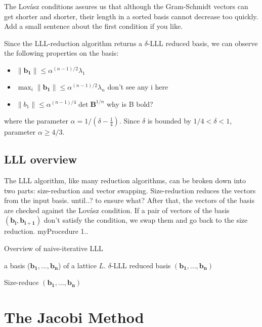 \documentclass[10pt, a4paper]{article}
\newcommand{\my}[1]{{\color{blue} #1 }}
\renewcommand{\vec}[1]{\mathbf{#1}}
\begin{document}
The Lovász conditions assures us that although the Gram-Schmidt vectors can get shorter and shorter, their length in a sorted basis cannot decrease too quickly. \my{Add a small sentence about the first condition if you like.}

Since the LLL-reduction algorithm returns a $\delta$-LLL reduced basis, we can observe the following properties on the basis:
\begin{itemize}
\item $\| \vec{b_1} \| \leq \alpha^{(n-1)/2} \lambda_1 $
\item $\max_i \| \vec{b_1} \| \leq \alpha^{(n-1)/2} \lambda_n $ \my{don't see any i here}
\item $\| b_1 \| \leq \alpha^{(n-1)/4} \det \vec{B}^{1/n}$ \my{why is B bold?}
\end{itemize} 
where the parameter $\alpha = 1/(\delta - \frac{1}{4})$. Since $\delta$ is bounded by $1/4 < \delta < 1$, parameter $\alpha \geq 4/3$.

\subsection{LLL overview}

The LLL algorithm, like many reduction algorithms, can be broken down into two parts: size-reduction and vector swapping. Size-reduction reduces the vectors from the input basis. \my{ until..? to ensure what?} After that, the vectors of the basis are checked against the Lovász condition. If a pair of vectors of the basis $(\vec{b_{i}}, \vec{b_{i+1}})$ \my{don't} satisfy the condition, we swap them and go back to the size reduction. my{Procedure 1..}

\begin{algorithm}[H]
\caption{Overview of naive-iterative LLL}
\label{lllAlgorithm}
\begin{algorithmic}[1]
\REQUIRE a basis ($\vec{b_1, ..., b_n}$) of a lattice $L$.
\ENSURE $\delta$-LLL reduced basis $(\vec{b_1, ..., b_n})$

\STATE Size-reduce $(\vec{b_1, ..., b_n})$
 \STATE{swap $\vec{b_j}$ and $\vec{b_{j+1}}$, go back to step 1} \ENDIF

\end{algorithmic}
\end{algorithm}

\section{The Jacobi Method}
\end{document}
